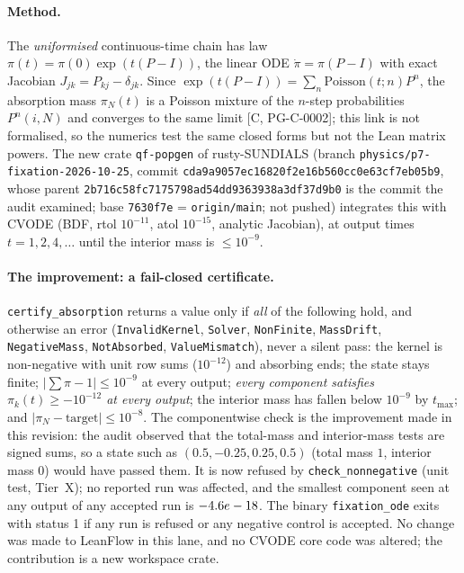\documentclass[11pt]{article}
\theoremstyle{remark}
\newcommand{\tier}[1]{\textsf{[#1]}}
\newcommand{\lean}[1]{\texttt{#1}}
\begin{document}
\paragraph{Method.} The \emph{uniformised} continuous-time chain has law $\pi(t)=\pi(0)\exp(t(P-I))$, the linear ODE
$\dot\pi=\pi(P-I)$ with exact Jacobian $J_{jk}=P_{kj}-\delta_{jk}$. Since $\exp(t(P-I))=\sum_n\mathrm{Poisson}(t;n)P^n$,
the absorption mass $\pi_N(t)$ is a Poisson mixture of the $n$-step probabilities $P^n(i,N)$ and converges to the same limit
\tier{C, PG-C-0002}; this link is not formalised, so the numerics test the same closed forms but not the Lean matrix powers.
The new crate \lean{qf-popgen} of rusty-SUNDIALS (branch \texttt{physics/p7-fixation-2026-10-25}, commit
\texttt{cda9a9057ec16820f2e16b560cc0e63cf7eb05b9}, whose parent \texttt{2b716c58fc7175798ad54dd9363938a3df37d9b0} is the commit the audit examined;
base \texttt{7630f7e} = \texttt{origin/main}; not pushed) integrates this with
CVODE (BDF, rtol $10^{-11}$, atol $10^{-15}$, analytic Jacobian), at output times $t=1,2,4,\dots$ until the interior mass is
$\le10^{-9}$.

\paragraph{The improvement: a fail-closed certificate.} \lean{certify\_absorption} returns a value only if \emph{all} of the following hold, and
otherwise an error (\lean{InvalidKernel}, \lean{Solver}, \lean{NonFinite}, \lean{MassDrift}, \lean{NegativeMass}, \lean{NotAbsorbed}, \lean{ValueMismatch}), never a silent pass:
the kernel is non-negative with unit row sums ($10^{-12}$) and absorbing ends; the state stays finite; $|\sum\pi-1|\le10^{-9}$ at every output;
\emph{every component satisfies $\pi_k(t)\ge-10^{-12}$ at every output};
the interior mass has fallen below $10^{-9}$ by $t_{\max}$; and $|\pi_N-\text{target}|\le10^{-8}$.
The componentwise check is the improvement made in this revision: the audit observed that the total-mass and interior-mass tests are signed sums, so a state such as
$(0.5,-0.25,0.25,0.5)$ (total mass $1$, interior mass $0$) would have passed them. It is now refused by \lean{check\_nonnegative} (unit test, Tier~X);
no reported run was affected, and the smallest component seen at any output of any accepted run is $-4.6e-18$. The binary \lean{fixation\_ode} exits
with status 1 if any run is refused or any negative control is accepted. No change was made to LeanFlow in this lane, and no CVODE core code
was altered; the contribution is a new workspace crate.
\end{document}
